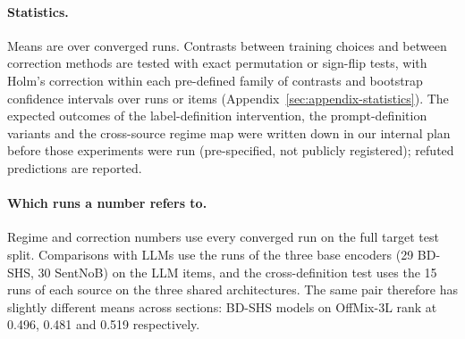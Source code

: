 \paragraph{Statistics.}
Means are over converged runs. Contrasts between training choices and between correction methods are tested with exact
permutation or sign-flip tests, with Holm's correction \citep{holm1979} within each pre-defined family of contrasts and
bootstrap confidence intervals over runs or items (Appendix~\ref{sec:appendix-statistics}). The expected outcomes
of the label-definition intervention, the prompt-definition variants and the cross-source regime map were written down
in our internal plan before those experiments were run (pre-specified, not publicly registered); refuted predictions
are reported.

\paragraph{Which runs a number refers to.}
Regime and correction numbers use every converged run on the full target test split. Comparisons with LLMs use the
runs of the three base encoders (29 BD-SHS, 30 SentNoB) on the LLM items, and the cross-definition test uses the 15 runs
of each source on the three shared architectures. The same pair therefore has slightly different means across
sections: BD-SHS models on OffMix-3L rank at 0.496, 0.481 and 0.519 respectively.
